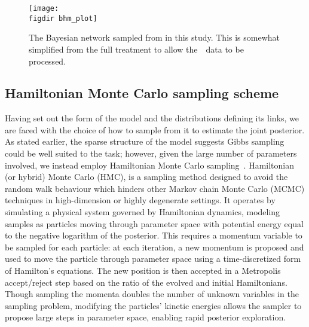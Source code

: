 \documentclass[a4paper,fleqn,usenatbib]{mnras}
\newcommand{\riess}{\citetalias{Riess_etal:2016}}
\begin{document}
{\begin{landscape}
\begin{figure}
\texttt{[image: \\figdir bhm\_plot]}
\caption{The Bayesian network sampled from in this study. This is somewhat simplified from the full treatment to allow the~\riess\ data to be processed.}
\label{figure:network}
\end{figure}
\end{landscape}


\subsection{Hamiltonian Monte Carlo sampling scheme}
\label{section:hmc}

Having set out the form of the model and the distributions defining its links, we are faced with the choice of how to sample from it to estimate the joint posterior. As stated earlier, the sparse structure of the model suggests Gibbs sampling could be well suited to the task; however, given the large number of parameters involved, we instead employ Hamiltonian Monte Carlo sampling~\citep{Duane_etal:1987,Neal:2012}. Hamiltonian (or hybrid) Monte Carlo (HMC), is a sampling method designed to avoid the random walk behaviour which hinders other Markov chain Monte Carlo (MCMC) techniques in high-dimension or highly degenerate settings. It operates by simulating a physical system governed by Hamiltonian dynamics, modeling samples as particles moving through parameter space with potential energy equal to the negative logarithm of the posterior. This requires a momentum variable to be sampled for each particle: at each iteration, a new momentum is proposed and used to move the particle through parameter space using a time-discretized form of Hamilton's equations. The new position is then accepted in a Metropolis accept/reject step based on the ratio of the evolved and initial Hamiltonians. Though sampling the momenta doubles the number of unknown variables in the sampling problem, modifying the particles' kinetic energies allows the sampler to propose large steps in parameter space, enabling rapid  posterior exploration.

}
\end{document}
